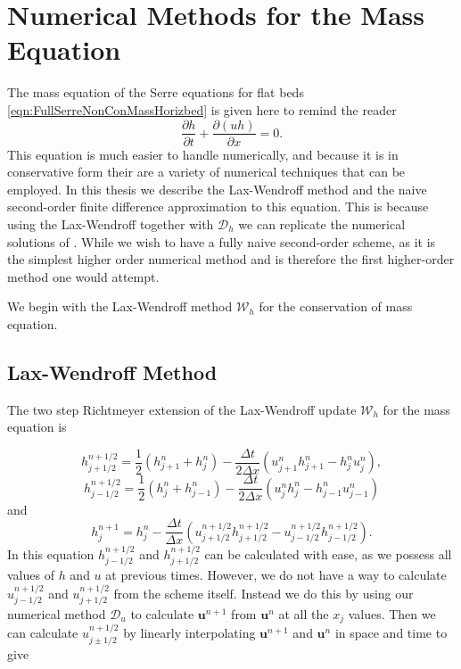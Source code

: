 \section{Numerical Methods for the Mass Equation}
The mass equation of the Serre equations for flat beds \eqref{eqn:FullSerreNonConMassHorizbed} is given here to remind the reader
\begin{equation*}
\frac{\partial h}{\partial t} + \dfrac{\partial (uh)}{\partial x} = 0.
\end{equation*}
This equation is much easier to handle numerically, and because it is in conservative form their are a variety of numerical techniques that can be employed. In this thesis we describe the Lax-Wendroff method and the naive second-order finite difference approximation to this equation. This is because using the Lax-Wendroff together with $\mathcal{D}_h$ we can replicate the numerical solutions of \cite{El-etal-2006}. While we wish to have a fully naive second-order scheme, as it is the simplest higher order numerical method and is therefore the first higher-order method one would attempt.

We begin with the Lax-Wendroff method $\mathcal{W}_h$ for the conservation of mass equation.

\subsection{Lax-Wendroff Method}
The two step Richtmeyer extension of the Lax-Wendroff update $\mathcal{W}_h$ for the mass equation is

	\begin{equation*}
	h^{n + 1/2}_{j+ 1/2} = \frac{1}{2}\left(h^{n}_{j+1} + h^{n}_j\right) - \frac{\Delta t}{2\Delta x}\left(u^n_{j+1}h^n_{j+1} - h^n_{j}u^n_{j}\right),
	\end{equation*}
	\begin{equation*}
	h^{n + 1/2}_{j- 1/2} = \frac{1}{2}\left(h^{n}_{j} + h^{n}_{j-1}\right) - \frac{\Delta t}{2\Delta x}\left(u^n_{j}h^n_{j} - h^n_{j-1}u^n_{j-1}\right)
	\end{equation*}
	and
	\begin{equation*}
	h^{n+1}_j = h^{n}_j - \frac{\Delta t}{\Delta x}\left(u^{n + 1/2}_{j+ 1/2}h^{n + 1/2}_{j+ 1/2} - u^{n + 1/2}_{j- 1/2}h^{n + 1/2}_{j- 1/2}\right).
	\label{eq:LW4h}
	\end{equation*}
In this equation $h^{n + 1/2}_{j- 1/2}$ and $h^{n + 1/2}_{j + 1/2}$ can be calculated with ease, as we possess all values of $h$ and $u$ at previous times. However, we do not have a way to calculate $u^{n + 1/2}_{j- 1/2}$ and $u^{n + 1/2}_{j+ 1/2}$ from the scheme itself. Instead we do this by using our numerical method $\mathcal{D}_u$ to calculate $\boldsymbol{u}^{n+1}$ from $\boldsymbol{u}^{n}$ at all the $x_j$ values. Then we can calculate $u^{n + 1/2}_{j \pm 1/2}$ by linearly interpolating $\boldsymbol{u}^{n+1}$ and $\boldsymbol{u}^{n}$ in space and time to give 

